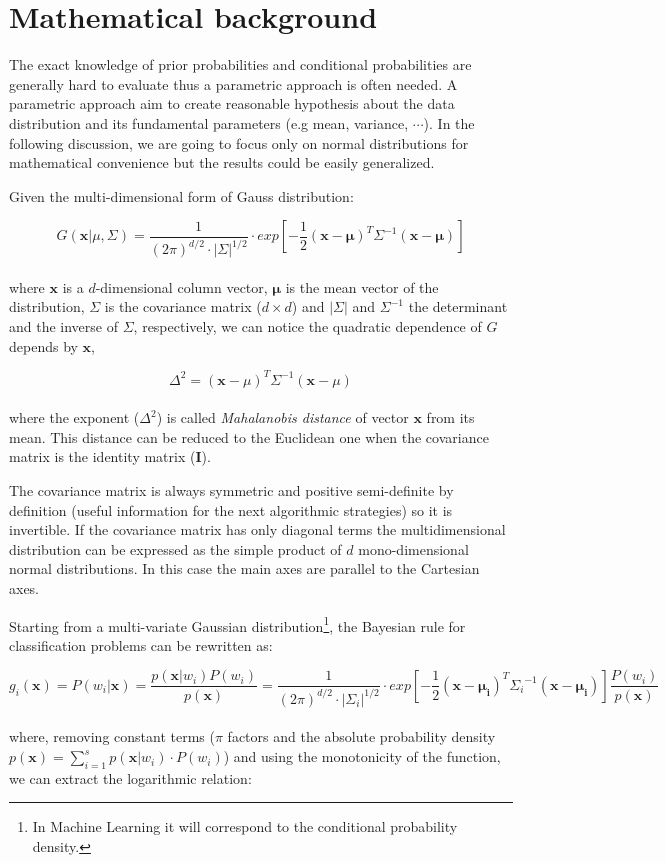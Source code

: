 \documentclass{standalone}
\begin{document}
\section*{Mathematical background}

The exact knowledge of prior probabilities and conditional probabilities are generally hard to evaluate thus a parametric approach is often needed.
A parametric approach aim to create reasonable hypothesis about the data distribution and its fundamental parameters (e.g mean, variance, $\cdots$).
In the following discussion, we are going to focus only on normal distributions for mathematical convenience but the results could be easily generalized.

Given the multi-dimensional form of Gauss distribution:

$$
G(\mathbf{x}|\mu, \Sigma) = \frac{1}{(2\pi)^{d/2}\cdot\left|\Sigma\right|^{1/2}}\cdot exp\left[-\frac{1}{2}(\mathbf{x}-\mathbf{\mu})^T\Sigma^{-1}(\mathbf{x}-\mathbf{\mu})\right]
$$
\\
where $\mathbf{x}$ is a $d$-dimensional column vector, $\mathbf{\mu}$ is the mean vector of the distribution, $\Sigma$ is the covariance matrix ($d\times d$) and $|\Sigma|$ and $\Sigma^{-1}$ the determinant and the inverse of $\Sigma$, respectively, we can notice the quadratic dependence of $G$ depends by $\mathbf{x}$,

$$
\Delta^2 = (\mathbf{x}-\mu)^T\Sigma^{-1}(\mathbf{x}-\mu)
$$
\\
where the exponent ($\Delta^2$) is called \emph{Mahalanobis distance} of vector $\mathbf{x}$ from its mean.
This distance can be reduced to the Euclidean one when the covariance matrix is the identity matrix ($\mathbf{I}$).

The covariance matrix is always symmetric and positive semi-definite by definition (useful information for the next algorithmic strategies) so it is invertible.
If the covariance matrix has only diagonal terms the multidimensional distribution can be expressed as the simple product of $d$ mono-dimensional normal distributions.
In this case the main axes are parallel to the Cartesian axes.

Starting from a multi-variate Gaussian distribution\footnote{
  In Machine Learning it will correspond to the conditional probability density.
}, the Bayesian rule for classification problems can be rewritten as:

$$
g_i(\mathbf{x}) = P(w_i|\mathbf{x}) = \frac{p(\mathbf{x}|w_i)P(w_i)}{p(\mathbf{x})} = \frac{1}{(2\pi)^{d/2}\cdot\left|\Sigma_i\right|^{1/2}}\cdot exp\left[-\frac{1}{2}(\mathbf{x}-\mathbf{\mu_i})^T{\Sigma_i}^{-1}(\mathbf{x}-\mathbf{\mu_i})\right] \frac{P(w_i)}{p(\mathbf{x})}
$$
\\
where, removing constant terms ($\pi$ factors and the absolute probability density $p(\mathbf{x}) = \sum_{i=1}^s p(\mathbf{x}|w_i)\cdot P(w_i)$) and using the monotonicity of the function, we can extract the logarithmic relation:
\end{document}
